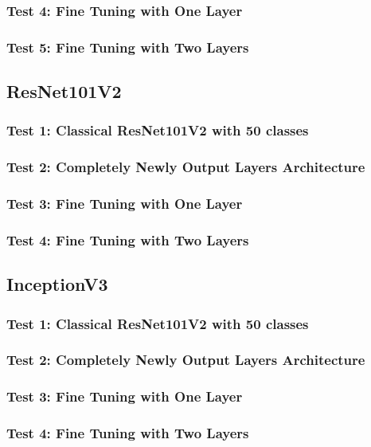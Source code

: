 \subsubsection{Test 4: Fine Tuning with One Layer}

\subsubsection{Test 5: Fine Tuning with Two Layers}







\subsection{ResNet101V2}

\subsubsection{Test 1: Classical ResNet101V2 with 50 classes}

\subsubsection{Test 2: Completely Newly Output Layers Architecture}

\subsubsection{Test 3: Fine Tuning with One Layer}

\subsubsection{Test 4: Fine Tuning with Two Layers}







\subsection{InceptionV3}

\subsubsection{Test 1: Classical ResNet101V2 with 50 classes}

\subsubsection{Test 2: Completely Newly Output Layers Architecture}

\subsubsection{Test 3: Fine Tuning with One Layer}

\subsubsection{Test 4: Fine Tuning with Two Layers}


